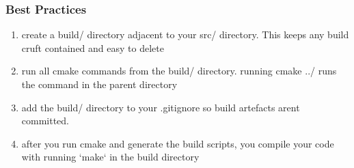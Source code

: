 \documentclass[11pt]{article}
\begin{document}
\subsubsection{Best Practices}
\label{sec:orgc8d740c}
\begin{enumerate}
\item create a build/ directory adjacent to your src/ directory. This keeps any build cruft contained and easy to delete
\label{sec:orgb3f5924}
\item run all cmake commands from the build/ directory. running cmake ../ runs the command in the parent directory
\label{sec:org28eb253}
\item add the build/ directory to your .gitignore so build artefacts arent committed.
\label{sec:org78158eb}
\item after you run cmake and generate the build scripts, you compile your code with running `make` in the build directory
\label{sec:org0a66eeb}
\end{enumerate}
\end{document}
